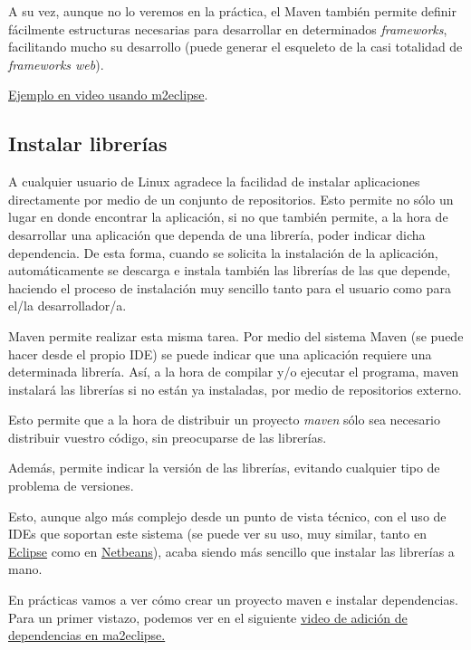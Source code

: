 \documentclass[11pt]{article}
\begin{document}
A su vez, aunque no lo veremos en la práctica, el Maven también permite definir fácilmente estructuras necesarias para
desarrollar en determinados \emph{frameworks}, facilitando mucho su desarrollo (puede generar el esqueleto de la casi
totalidad de \emph{frameworks web}).


\href{http://www.youtube.com/watch?v%3DX8lu7Oi23YQ}{Ejemplo en video usando m2eclipse}.
\subsection{Instalar librerías}
\label{sec-5-2}




A cualquier usuario de Linux agradece la facilidad de instalar aplicaciones directamente 
por medio de un conjunto de repositorios. Esto permite no sólo un lugar en donde encontrar la aplicación, si no que
también permite, a la hora de desarrollar una aplicación que dependa de
una librería, poder indicar dicha dependencia. De esta forma, cuando se solicita la instalación de la aplicación, 
automáticamente se descarga e instala también las librerías de las que depende, haciendo el proceso de 
instalación muy sencillo tanto para el usuario como para el/la desarrollador/a. 


Maven permite realizar esta misma tarea. Por medio del sistema Maven (se puede hacer desde el propio IDE) se puede
indicar que una aplicación requiere una determinada librería. Así, a la hora de compilar y/o ejecutar el programa, 
maven instalará las librerías si no están ya instaladas, por medio de repositorios externo. 


Esto permite que a la hora de distribuir un proyecto \emph{maven} sólo sea necesario distribuir vuestro código, sin
preocuparse de las librerías.


Además, permite indicar la versión de las librerías, evitando cualquier tipo de problema de versiones.


Esto, aunque algo más complejo desde un punto de vista técnico, con el uso de IDEs que soportan este sistema 
(se puede ver su uso, muy similar, tanto en \href{http://m2eclipse.sonatype.org/adding-project-dependencies-in-m2eclipse.html}{Eclipse} como en \href{http://wiki.netbeans.org/MavenBestPractices}{Netbeans}), acaba siendo más sencillo que instalar las 
librerías a mano. 


En prácticas vamos a ver cómo crear un proyecto maven e instalar dependencias. Para un primer vistazo, podemos
ver en el siguiente \href{http://www.youtube.com/watch?v%3DH8QdjyCB8Nw}{video de adición de dependencias en ma2eclipse.}
\end{document}
